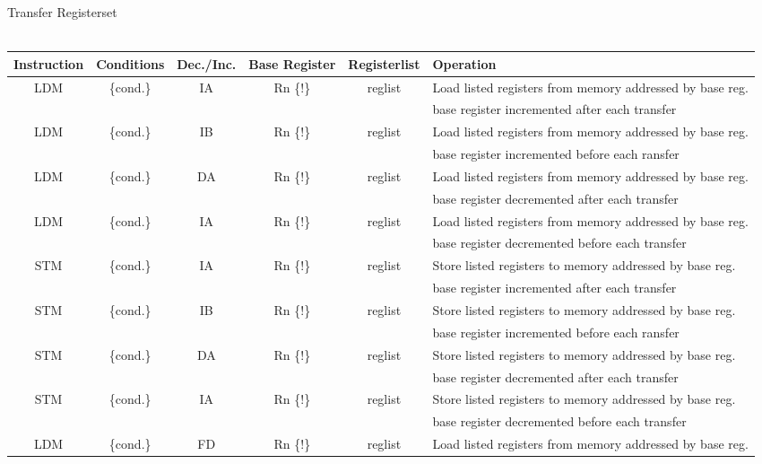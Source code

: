 {\begin{landscape}
\newpage
{\rot Transfer Registerset}\\
\\
\begin{tabular}{|c|c|c|c|c|l|}
\hline
Instruction & Conditions & Dec./Inc. & Base Register & Registerlist  & Operation\\
\hline
LDM & \{cond.\} & IA & Rn \{!\} & reglist & Load listed registers from memory addressed by base reg.\\
    &           &    &          & 	  & base register incremented after each transfer\\
\hline
LDM & \{cond.\} & IB & Rn \{!\} & reglist & Load listed registers from memory addressed by base reg.\\
    &           &    &          & 	  & base register incremented before each ransfer\\
\hline
LDM & \{cond.\} & DA & Rn \{!\} & reglist & Load listed registers from memory addressed by base reg.\\
    &           &    &          & 	  & base register decremented after each transfer\\
\hline
LDM & \{cond.\} & IA & Rn \{!\} & reglist & Load listed registers from memory addressed by base reg.\\
    &           &    &          & 	  & base register decremented before each transfer\\
\hline
\hline
STM & \{cond.\} & IA & Rn \{!\} & reglist & Store listed registers to memory addressed by base reg.\\
    &           &    &          & 	  & base register incremented after each transfer\\
\hline
STM & \{cond.\} & IB & Rn \{!\} & reglist & Store listed registers to memory addressed by base reg.\\
    &           &    &          & 	  & base register incremented before each ransfer\\
\hline
STM & \{cond.\} & DA & Rn \{!\} & reglist & Store listed registers to memory addressed by base reg.\\
    &           &    &          & 	  & base register decremented after each transfer\\
\hline
STM & \{cond.\} & IA & Rn \{!\} & reglist & Store listed registers to memory addressed by base reg.\\
    &           &    &          & 	  & base register decremented before each transfer\\
\hline
\hline
LDM & \{cond.\} & FD & Rn \{!\} & reglist & Load listed registers from memory addressed by base reg.\\

\end{tabular}
\end{landscape}}
